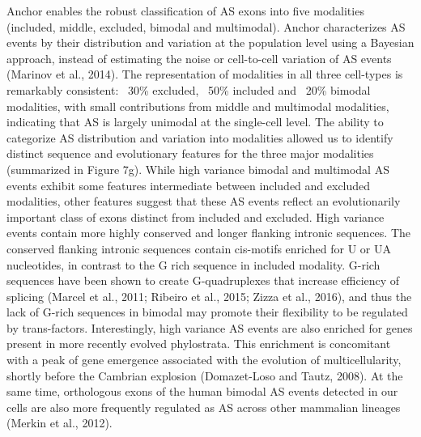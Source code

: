 Anchor enables the robust classification of AS exons into five modalities (included, middle, excluded, bimodal and multimodal). Anchor characterizes AS events by their distribution and variation at the population level using a Bayesian approach, instead of estimating the noise or cell-to-cell variation of AS events (Marinov et al., 2014).  The representation of modalities in all three cell-types is remarkably consistent: ~30\% excluded, ~50\% included and ~20\% bimodal modalities, with small contributions from middle and multimodal modalities, indicating that AS is largely unimodal at the single-cell level. The ability to categorize AS distribution and variation into modalities allowed us to identify distinct sequence and evolutionary features for the three major modalities (summarized in Figure 7g). While high variance bimodal and multimodal AS events exhibit some features intermediate between included and excluded modalities, other features suggest that these AS events reflect an evolutionarily important class of exons distinct from included and excluded. High variance events contain more highly conserved and longer flanking intronic sequences. The conserved flanking intronic sequences contain cis-motifs enriched for U or UA nucleotides, in contrast to the G rich sequence in included modality. G-rich sequences have been shown to create G-quadruplexes that increase efficiency of splicing (Marcel et al., 2011; Ribeiro et al., 2015; Zizza et al., 2016), and thus the lack of G-rich sequences in bimodal may promote their flexibility to be regulated by trans-factors. Interestingly, high variance AS events are also enriched for genes present in more recently evolved phylostrata. This enrichment is concomitant with a peak of gene emergence associated with the evolution of multicellularity, shortly before the Cambrian explosion (Domazet-Loso and Tautz, 2008). At the same time, orthologous exons of the human bimodal AS events detected in our cells are also more frequently regulated as AS across other mammalian lineages (Merkin et al., 2012).

